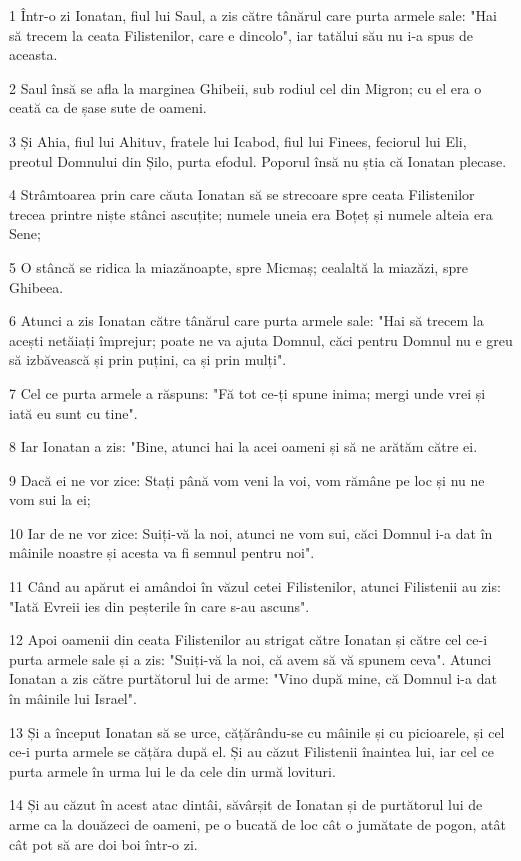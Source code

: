 \par 1 Într-o zi Ionatan, fiul lui Saul, a zis către tânărul care purta armele sale: "Hai să trecem la ceata Filistenilor, care e dincolo", iar tatălui său nu i-a spus de aceasta.
\par 2 Saul însă se afla la marginea Ghibeii, sub rodiul cel din Migron; cu el era o ceată ca de șase sute de oameni.
\par 3 Și Ahia, fiul lui Ahituv, fratele lui Icabod, fiul lui Finees, feciorul lui Eli, preotul Domnului din Șilo, purta efodul. Poporul însă nu știa că Ionatan plecase.
\par 4 Strâmtoarea prin care căuta Ionatan să se strecoare spre ceata Filistenilor trecea printre niște stânci ascuțite; numele uneia era Boțeț și numele alteia era Sene;
\par 5 O stâncă se ridica la miazănoapte, spre Micmaș; cealaltă la miazăzi, spre Ghibeea.
\par 6 Atunci a zis Ionatan către tânărul care purta armele sale: "Hai să trecem la acești netăiați împrejur; poate ne va ajuta Domnul, căci pentru Domnul nu e greu să izbăvească și prin puțini, ca și prin mulți".
\par 7 Cel ce purta armele a răspuns: "Fă tot ce-ți spune inima; mergi unde vrei și iată eu sunt cu tine".
\par 8 Iar Ionatan a zis: "Bine, atunci hai la acei oameni și să ne arătăm către ei.
\par 9 Dacă ei ne vor zice: Stați până vom veni la voi, vom rămâne pe loc și nu ne vom sui la ei;
\par 10 Iar de ne vor zice: Suiți-vă la noi, atunci ne vom sui, căci Domnul i-a dat în mâinile noastre și acesta va fi semnul pentru noi".
\par 11 Când au apărut ei amândoi în văzul cetei Filistenilor, atunci Filistenii au zis: "Iată Evreii ies din peșterile în care s-au ascuns".
\par 12 Apoi oamenii din ceata Filistenilor au strigat către Ionatan și către cel ce-i purta armele sale și a zis: "Suiți-vă la noi, că avem să vă spunem ceva". Atunci Ionatan a zis către purtătorul lui de arme: "Vino după mine, că Domnul i-a dat în mâinile lui Israel".
\par 13 Și a început Ionatan să se urce, cățărându-se cu mâinile și cu picioarele, și cel ce-i purta armele se cățăra după el. Și au căzut Filistenii înaintea lui, iar cel ce purta armele în urma lui le da cele din urmă lovituri.
\par 14 Și au căzut în acest atac dintâi, săvârșit de Ionatan și de purtătorul lui de arme ca la douăzeci de oameni, pe o bucată de loc cât o jumătate de pogon, atât cât pot să are doi boi într-o zi.

